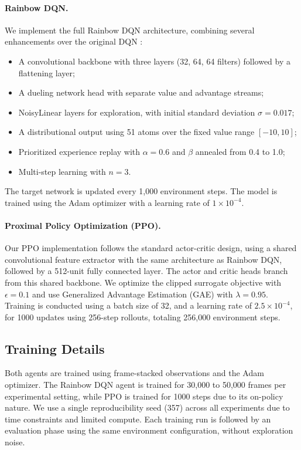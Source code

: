 \documentclass{article}
\begin{document}
\paragraph{Rainbow DQN.}
We implement the full Rainbow DQN \cite{hessel2018rainbow} architecture, combining several enhancements over the original DQN \cite{mnih2015human}:
\begin{itemize}
    \item A convolutional backbone with three layers (32, 64, 64 filters) followed by a flattening layer;
    \item A dueling network head with separate value and advantage streams;
    \item NoisyLinear layers for exploration, with initial standard deviation $\sigma=0.017$;
    \item A distributional output using 51 atoms over the fixed value range $[-10, 10]$;
    \item Prioritized experience replay with $\alpha = 0.6$ and $\beta$ annealed from 0.4 to 1.0;
    \item Multi-step learning with $n = 3$.
\end{itemize}
The target network is updated every 1,000 environment steps. The model is trained using the Adam optimizer with a learning rate of $1 \times 10^{-4}$.

\paragraph{Proximal Policy Optimization (PPO).}
Our PPO implementation follows the standard actor-critic design, using a shared convolutional feature extractor with the same architecture as Rainbow DQN, followed by a 512-unit fully connected layer. The actor and critic heads branch from this shared backbone. We optimize the clipped surrogate objective with $\epsilon = 0.1$ and use Generalized Advantage Estimation (GAE) with $\lambda = 0.95$. Training is conducted using a batch size of 32, and a learning rate of $2.5 \times 10^{-4}$, for 1000 updates using 256-step rollouts, totaling 256,000 environment steps.

\subsection{Training Details}

Both agents are trained using frame-stacked observations and the Adam optimizer. The Rainbow DQN agent is trained for 30,000 to 50,000 frames per experimental setting, while PPO is trained for 1000 steps due to its on-policy nature. We use a single reproducibility seed (357) across all experiments due to time constraints and limited compute. Each training run is followed by an evaluation phase using the same environment configuration, without exploration noise.
\end{document}
